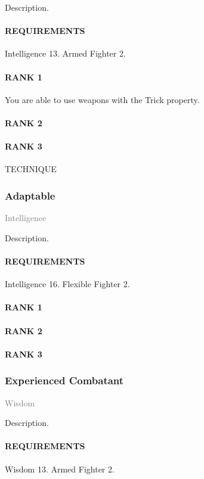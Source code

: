 \normalsize
Description.
\paragraph{REQUIREMENTS} Intelligence 13. Armed Fighter 2.
\paragraph{RANK 1} You are able to use weapons with the Trick property.
\paragraph{RANK 2}
\paragraph{RANK 3} TECHNIQUE

\subsubsection{Adaptable} \label{feat::adaptable} %
\small{\textcolor{gray}{Intelligence}}

\normalsize
Description.
\paragraph{REQUIREMENTS} Intelligence 16. Flexible Fighter 2.
\paragraph{RANK 1} %
\paragraph{RANK 2}
\paragraph{RANK 3}

\subsubsection{Experienced Combatant} \label{feat::experiencedcombatant} %
\small{\textcolor{gray}{Wisdom}}

\normalsize
Description.
\paragraph{REQUIREMENTS} Wisdom 13. Armed Fighter 2.
